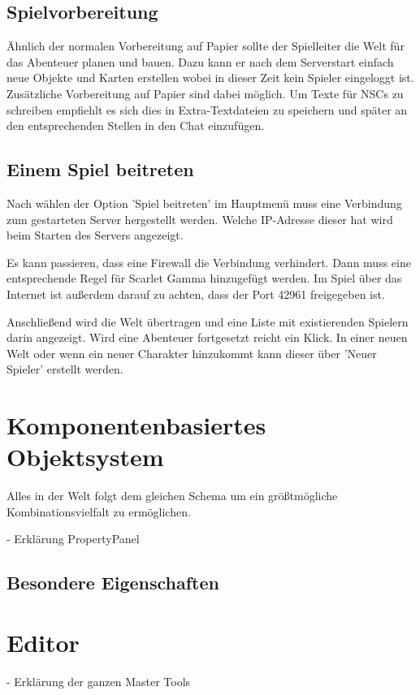 \documentclass[german,10pt,a4paper,twocolumn,colorscheme=darkblue]{orarticle}
\begin{document}
		\subsection{Spielvorbereitung}
			Ähnlich der normalen Vorbereitung auf Papier sollte der Spielleiter die Welt für das Abenteuer planen und bauen. Dazu kann er nach dem Serverstart einfach neue Objekte und Karten erstellen wobei in dieser Zeit kein Spieler eingeloggt ist. Zusätzliche Vorbereitung auf Papier sind dabei möglich. Um Texte für NSCs zu schreiben empfiehlt es sich dies in Extra-Textdateien zu speichern und später an den entsprechenden Stellen in den Chat einzufügen.
		
		\subsection{Einem Spiel beitreten}
			Nach wählen der Option 'Spiel beitreten' im Hauptmenü muss eine Verbindung zum gestarteten Server hergestellt werden. Welche IP-Adresse dieser hat wird beim Starten des Servers angezeigt.
			
			Es kann passieren, dass eine Firewall die Verbindung verhindert. Dann muss eine entsprechende Regel für Scarlet Gamma hinzugefügt werden. Im Spiel über das Internet ist außerdem darauf zu achten, dass der Port 42961 freigegeben ist.
			
			Anschließend wird die Welt übertragen und eine Liste mit existierenden Spielern darin angezeigt. Wird eine Abenteuer fortgesetzt reicht ein Klick. In einer neuen Welt oder wenn ein neuer Charakter hinzukommt kann dieser über 'Neuer Spieler' erstellt werden.
		
	\section{Komponentenbasiertes Objektsystem}
		Alles in der Welt folgt dem gleichen Schema um ein größtmögliche Kombinationsvielfalt zu ermöglichen.
		
		- Erklärung PropertyPanel
	
		\subsection{Besondere Eigenschaften}
	
	\section{Editor}
		- Erklärung der ganzen Master Tools
	
\end{document}
